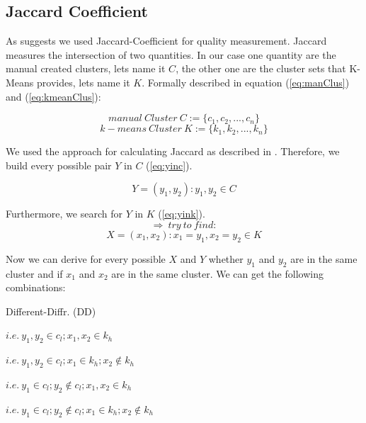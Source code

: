 \documentclass[a4paper]{IEEEtran}
\begin{document}
\subsection{Jaccard Coefficient}
As \cite{halkidi2002cluster} suggests we used Jaccard-Coefficient for quality measurement. Jaccard measures the intersection of two quantities. In our case one quantity are the manual created clusters, lets name it $C$, the other one are the cluster sets that K-Means provides, lets name it $K$. Formally described in equation (\ref{eq:manClus}) and (\ref{eq:kmeanClus}):

\begin{equation}
\label{eq:manClus}
manual~Cluster~C := \{ c_1,c_2,...,c_n \}
\end{equation}
\begin{equation}
\label{eq:kmeanClus}
k-means~Cluster~K := \{ k_1,k_2,...,k_n \}
\end{equation}

We used the approach for calculating Jaccard as described in \cite{halkidi2002cluster}. Therefore, we build every possible pair $Y$ in $C$ (\ref{eq:yinc}).

\begin{equation}
\label{eq:yinc}
Y= ( y_1,y_2) : y_1, y_2 \in C
\end{equation}

Furthermore, we search for $Y$ in $K$ (\ref{eq:yink}). 
\begin{equation*}
\Rightarrow ~try~to~find:
\end{equation*}
\begin{equation}
\label{eq:yink}
X= ( x_1,x_2) : x_1= y_1,x_2= y_2 \in K
\end{equation}

Now we can derive for every possible $X$ and $Y$ whether $y_1$  and $y_2$ are in the same cluster and if $x_1$  and $x_2$ are in the same cluster. We can get the following combinations: \\
\begin{labeling}{Different-Diffr. (DD)}
\item [Same-Same (SS)]  $i.e.~y_1,y_2 \in c_l; x_1,x_2 \in k_h$ \\
\item [Same-Different (SD)]  $i.e.~ y_1,y_2 \in c_l; x_1 \in k_h; x_2 \notin k_h$ \\
\item [Different-Same (DS)]  $i.e.~ y_1 \in c_l; y_2 \notin c_l; x_1,x_2 \in k_h$ \\
\item [Different-Diffr. (DD)]  $i.e.~y_1 \in c_l; y_2 \notin c_l; x_1 \in k_h;x_2 \notin k_h$\\
\end{labeling}
\end{document}
